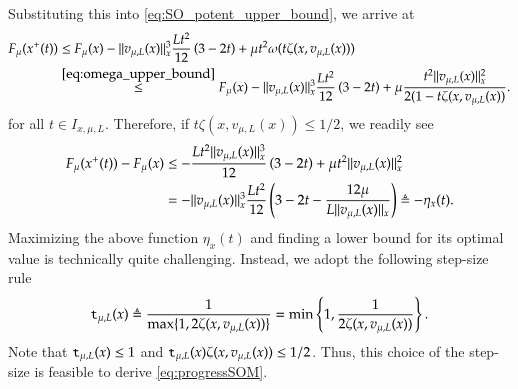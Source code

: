 Substituting this into \eqref{eq:SO_potent_upper_bound}, we arrive at
\begin{align*}
F_{\mu}(x^{+}(t))&\leq F_{\mu}(x) - \lVert v_{\mu,L}(x)\rVert^{3}_{x} \frac{Lt^2}{12} \left(3 - 2t \right)+\mu t^{2}\omega(t\zeta(x,v_{\mu,L}(x)))\\ 
&\stackrel{\eqref{eq:omega_upper_bound}}{\leq}  F_{\mu}(x) - \lVert v_{\mu,L}(x)\rVert^{3}_{x} \frac{Lt^2}{12} \left(3 - 2t \right)+\mu \frac{t^{2}\lVert v_{\mu,L}(x)\rVert_{x}^{2}}{2(1-t\zeta(x,v_{\mu,L}(x))}. 
\end{align*} 
for all  $t \in I_{x,\mu,L}$. Therefore, if $t\zeta(x,v_{\mu,L}(x))\leq 1/2$, we readily see%
\begin{align}
F_{\mu}(x^{+}(t))-F_{\mu}(x)&\leq - \frac{Lt^2\lVert v_{\mu,L}(x)\rVert^{3}_{x} }{12} \left(3 - 2t \right)+\mu t^{2}\lVert v_{\mu,L}(x)\rVert_{x}^{2} \nonumber \\
&= - \lVert v_{\mu,L}(x)\rVert^{3}_{x} \frac{Lt^2}{12}\left(3 - 2t - \frac{12 \mu}{L\lVert v_{\mu,L}(x)\rVert_{x}} \right) \triangleq -\eta_{x}(t).\label{eq:progressSOM}
\end{align}
Maximizing the above function $\eta_{x}(t)$ and finding a lower bound for its optimal value is technically quite challenging. Instead, we adopt the following step-size rule
\begin{equation}
\label{eq:SO_t_opt_def}
\mathtt{t}_{\mu,L}(x) \triangleq \frac{1}{\max\{1,2\zeta(x,v_{\mu,L}(x))\}} = \min \left\{1, \frac{1}{2\zeta(x,v_{\mu,L}(x))}  \right\}.
\end{equation}  
Note that $\mathtt{t}_{\mu,L}(x) \leq 1$ and $\mathtt{t}_{\mu,L}(x)\zeta(x,v_{\mu,L}(x))\leq 1/2$. Thus, this choice of the step-size is feasible to derive \eqref{eq:progressSOM}. 

